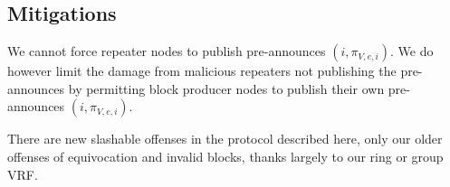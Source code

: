 \subsection{Mitigations}\label{subsec:slashing}

We cannot force repeater nodes to publish pre-announces $(i,\pi_{V,e,i})$.  We do however limit the damage from malicious repeaters not publishing the pre-announces by permitting block producer nodes to publish their own pre-announces $(i,\pi_{V,e,i})$.  

There are new slashable offenses in the protocol described here, only our older offenses of equivocation and invalid blocks, thanks largely to our ring or group VRF.  






